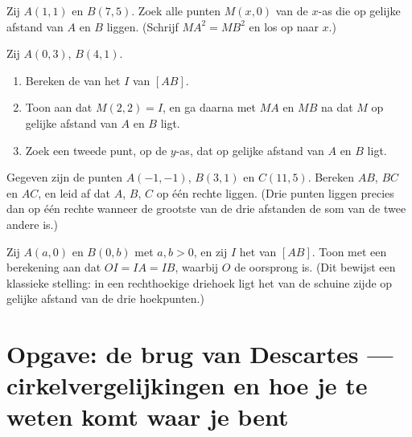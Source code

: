\begin{exercise}[$\star\star$]\label{exo:g10:coordgeom:7}
Zij $A(1, 1)$ en $B(7, 5)$. Zoek alle punten $M(x, 0)$ van de $x$-as die op
gelijke afstand van $A$ en $B$ liggen. (Schrijf $MA^2 = MB^2$ en los op naar
$x$.)
\end{exercise}

\begin{exercise}[$\star\star$]\label{exo:g10:coordgeom:8}
Zij $A(0, 3)$, $B(4, 1)$.
\begin{enumerate}
  \item Bereken de  van het  $I$ van $[AB]$.
  \item Toon aan dat $M(2, 2) = I$, en ga daarna met $MA$ en $MB$ na dat $M$
        op gelijke afstand van $A$ en $B$ ligt.
  \item Zoek een tweede punt, op de $y$-as, dat op gelijke afstand van $A$ en
        $B$ ligt.
\end{enumerate}
\end{exercise}

\begin{exercise}[$\star\star$]\label{exo:g10:coordgeom:9}
Gegeven zijn de punten $A(-1, -1)$, $B(3, 1)$ en $C(11, 5)$. Bereken $AB$,
$BC$ en $AC$, en leid af dat $A$, $B$, $C$ op één rechte liggen. (Drie punten
liggen precies dan op één rechte wanneer de grootste van de drie afstanden de
som van de twee andere is.)
\end{exercise}

\begin{exercise}[$\star\star\star$]\label{exo:g10:coordgeom:10}
Zij $A(a, 0)$ en $B(0, b)$ met $a, b > 0$, en zij $I$ het  van $[AB]$.
Toon met een berekening aan dat $OI = IA = IB$, waarbij $O$ de oorsprong is.
(Dit bewijst een klassieke stelling: in een rechthoekige driehoek ligt het
 van de schuine zijde op gelijke afstand van de drie hoekpunten.)
\end{exercise}

\section{Opgave: de brug van Descartes --- cirkelvergelijkingen en hoe je
te weten komt waar je bent}

